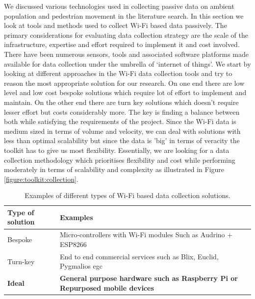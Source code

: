 We discussed various technologies used in collecting passive data on ambient population and pedestrian movement in the literature search.
In this section we look at tools and methods used to collect Wi-Fi based data passively.
The primary considerations for evaluating data collection strategy are the scale of the infrastructure, expertise and effort required to implement it and cost involved.
There have been numerous sensors, tools and associated software platforms made available for data collection under the umbrella of `internet of things'.
We start by looking at different approaches in the Wi-Fi data collection tools and try to reason the most appropriate solution for our research.
On one end there are low level and low cost bespoke solutions which require lot of effort to implement and maintain.
On the other end there are turn key solutions which doesn't require lesser effort but costs considerably more.
The key is finding a balance between both while satisfying the requirements of the project.
Since the Wi-Fi data is medium sized in terms of volume and velocity, we can deal with solutions with less than optimal scalability but since the data is 'big' in terms of veracity the toolkit has to give us most flexibility. 
Essentially, we are looking for a data collection methodology which prioritises flexibility and cost while performing moderately in terms of scalability and complexity as illustrated in Figure \ref{figure:toolkit:collection}.

\begin{table}[h]
  \footnotesize
  \begin{center}
    \begin{tabular}{lp{5cm}}
      \toprule
      Type of solution & Examples\\
      \midrule
      Bespoke & Micro-controllers with Wi-Fi modules Such as Audrino + ESP8266\\
      Turn-key & End to end commercial services such as Blix, Euclid, Pygmalios egc\\ 
      \textbf{Ideal} & \textbf{General purpose hardware such as Raspberry Pi or Repurposed mobile devices}\\
      \bottomrule
    \end{tabular}
  \end{center}
  \caption{Examples of different types of Wi-Fi based data collection solutions.}
  \label{table:toolkit:collection}
\end{table}

